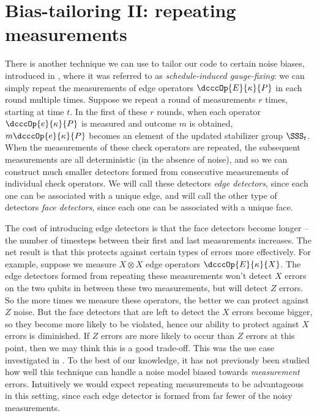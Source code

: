 \section{Bias-tailoring II: repeating measurements}\label{sec:gauge_dcccs}

There is another technique we can use to tailor our code to certain noise biases, introduced in , where it was referred to as \textit{schedule-induced gauge-fixing}:
we can simply repeat the measurements of edge operators $\dcccOp{E}{\kappa}{P}$ in each round multiple times.
Suppose we repeat a round of measurements $r$ times, starting at time $t$.
In the first of these $r$ rounds, when each operator $\dcccOp{e}{\kappa}{P}$ is measured and outcome $m$ is obtained, $m\dcccOp{e}{\kappa}{P}$ becomes an element of the updated stabilizer group $\SSS_t$.
When the measurements of these check operators are repeated, the subsequent measurements are all deterministic (in the absence of noise), and so we can construct much smaller detectors formed from consecutive measurements of individual check operators.
We will call these detectors \textit{edge detectors}, since each one can be associated with a unique edge, and will call the other type of detectors \textit{face detectors}, since each one can be associated with a unique face.

The cost of introducing edge detectors is that the face detectors become longer -- the number of timesteps between their first and last measurements increases.
The net result is that this protects against certain types of errors more effectively.
For example, suppose we measure $X \otimes X$ edge operators $\dcccOp{E}{\kappa}{X}$.
The edge detectors formed from repeating these measurements won't detect $X$ errors on the two qubits in between these two measurements, but will detect $Z$ errors.
So the more times we measure these operators, the better we can protect against $Z$ noise.
But the face detectors that are left to detect the $X$ errors become bigger, so they become more likely to be violated, hence our ability to protect against $X$ errors is diminished.
If $Z$ errors are more likely to occur than $Z$ errors at this point, then we may think this is a good trade-off.
This was the use case investigated in .
To the best of our knowledge, it has not previously been studied how well this technique can handle a noise model biased towards \textit{measurement} errors.
Intuitively we would expect repeating measurements to be advantageous in this setting, since each edge detector is formed from far fewer of the noisy measurements.


